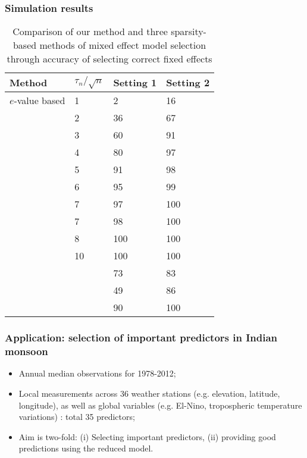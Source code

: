 \documentclass[10pt]{beamer}
\theoremstyle{definition}
\begin{document}
\begin{frame}
\frametitle{Simulation results}

\begin{table}[t]
	\centering
	\begin{scriptsize}
    \begin{tabular}{llll}
    \hline
    Method          & $\tau_n / \sqrt n$ & Setting 1 & Setting 2 \\ \hline
    $e$-value based     & 1 & 2         & 16       \\
    ~               & 2 & 36      & 67        \\
    ~               & 3 & 60        & 91      \\
    ~               & 4 & 80        & 97      \\
    ~               & 5 & 91        & 98       \\
    ~               & 6 & 95      & 99       \\
    ~               & 7 & 97       & 100       \\
    ~               & 7 & 98       & 100       \\
    ~               & 8 & 100       & 100       \\
    ~               & 10 & 100       & 100       \\\hline
    \cite{BondellKrishnaGhosh10} & ~ & 73        & 83        \\
    \cite{PengLu12}         & ~ & 49        & 86        \\
    \cite{FanLi12}           & ~ & 90        & 100       \\ \hline
    \end{tabular}
    \caption*{Comparison of our method and three sparsity-based methods of mixed effect model selection through accuracy of selecting correct fixed effects}
	\label{table:simtable2MS}
    \end{scriptsize}
\end{table}
\end{frame}


\begin{frame}
\frametitle{Application: selection of important predictors in Indian monsoon}

\begin{itemize}
\item Annual median observations for 1978-2012;

\item Local measurements across 36 weather stations (e.g. elevation, latitude, longitude), as well as global variables (e.g. El-Nino, tropospheric temperature variations) : total 35 predictors;

\item Aim is two-fold: (i) Selecting important predictors, (ii) providing good predictions using the reduced model.
\end{itemize}
\end{frame}
\end{document}
